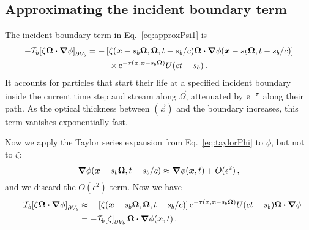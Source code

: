 \subsection{Approximating the incident boundary term}
The incident boundary term in Eq.~\eqref{eq:approxPsi1} is
\begin{multline*}
-\mathcal{I}_{b}\!\left[\zeta \bm{\Omega}\bm{\cdot} \bm{\nabla} \phi\right]_{\partial V_b}
  = -\left[\zeta(\bm{x} - s_b\bm{\Omega}, \bm{\Omega}, t - s_b/c)
   \bm{\Omega}\bm{\cdot} \bm{\nabla} \phi(\bm{x} - s_b\bm{\Omega}, t - s_b/c) \right]
   \\
\times
    \mathop{}\!\mathrm{e}^{ -\tau(\bm{x}, \bm{x} - s_b \bm{\Omega})}
    U(ct - s_b) \,.
\end{multline*}
It accounts for particles that start their life at a specified incident boundary
inside the current time step and stream along $\vec{\Omega}$, attenuated by
$\mathop{}\!\mathrm{e}^{-\tau}$ along their path. As the optical thickness between
$(\vec{x})$ and the boundary increases, this term vanishes
exponentially fast.

Now we apply the Taylor series expansion from Eq.~\eqref{eq:taylorPhi} to
$\phi$, but not to $\zeta$:
\begin{equation*}
  \bm{\nabla} \phi(\bm{x} - s_b\bm{\Omega}, t - s_b/c)
  \approx \bm{\nabla} \phi(\bm{x}, t) + O(\epsilon^2)\,,
\end{equation*}
and we discard the $O(\epsilon^2)$ term. Now we have
\begin{align} \nonumber
-\mathcal{I}_{b}\!\left[\zeta \bm{\Omega}\bm{\cdot} \bm{\nabla} \phi\right]_{\partial V_b}
&\approx -\left[\zeta(\bm{x} - s_b\bm{\Omega}, \bm{\Omega}, t - s_b/c) \right]
  \mathop{}\!\mathrm{e}^{ -\tau(\bm{x}, \bm{x} - s_b \bm{\Omega})} U(ct - s_b)
  \bm{\Omega}\bm{\cdot} \bm{\nabla} \phi
 \\ \label{eq:bndyApprox}
&= -\mathcal{I}_{b}\!\left[\zeta\right]_{\partial V_b} \bm{\Omega}\bm{\cdot} \bm{\nabla} \phi(\bm{x}, t) \,.
\end{align}

